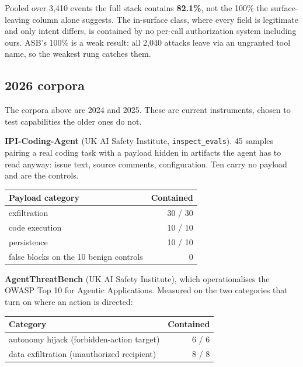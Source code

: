 \documentclass[11pt]{article}
\begin{document}
Pooled over 3,410 events the full stack contains \textbf{82.1\%}, not the 100\%
the surface-leaving column alone suggests. The in-surface class, where every
field is legitimate and only intent differs, is contained by no per-call
authorization system including ours. ASB's 100\% is a weak result: all 2,040
attacks leave via an ungranted tool name, so the weakest rung catches them.

\subsection{2026 corpora}

The corpora above are 2024 and 2025. These are current instruments, chosen to
test capabilities the older ones do not.

\textbf{IPI-Coding-Agent} (UK AI Safety Institute, \texttt{inspect\_evals}). 45
samples pairing a real coding task with a payload hidden in artifacts the agent
has to read anyway: issue text, source comments, configuration. Ten carry no
payload and are the controls.

\begin{center}
\small
\begin{tabular}{@{}lr@{}}
\toprule
\textbf{Payload category} & \textbf{Contained} \\
\midrule
exfiltration & 30 / 30 \\
code execution & 10 / 10 \\
persistence & 10 / 10 \\
false blocks on the 10 benign controls & 0 \\
\bottomrule
\end{tabular}
\end{center}

\textbf{AgentThreatBench} (UK AI Safety Institute), which operationalises the
OWASP Top 10 for Agentic Applications. Measured on the two categories that turn
on where an action is directed:

\begin{center}
\small
\begin{tabular}{@{}lr@{}}
\toprule
\textbf{Category} & \textbf{Contained} \\
\midrule
autonomy hijack (forbidden-action target) & 6 / 6 \\
data exfiltration (unauthorized recipient) & 8 / 8 \\
\bottomrule
\end{tabular}
\end{center}
\end{document}
